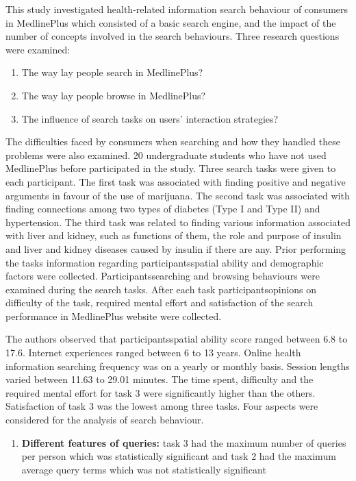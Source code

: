 \documentclass[]{article}
\begin{document}
\begin{enumerate}
This study investigated health-related information search behaviour of consumers in MedlinePlus which consisted of a basic search engine, and the impact of the number of concepts involved in the search behaviours. Three research  questions were examined:

\begin{enumerate}
		\item The way lay people search in MedlinePlus?
		\item The way lay people browse in MedlinePlus?  
		\item The influence of search tasks on users' interaction strategies?
\end{enumerate}

The difficulties faced by consumers when searching and how they handled these problems were also examined. 20 undergraduate students who have not used MedlinePlus before participated in the study. Three search tasks were given to each participant. The first task was associated with finding positive and negative arguments in favour of the use of \textquotesingle marijuana\textquotesingle . The second task was associated with finding connections among two types of diabetes (Type I and Type II) and hypertension. The third task was related to finding various information associated with liver and kidney, such as functions of them, the role and purpose of insulin and liver and kidney diseases caused by insulin if there are any. Prior performing the tasks information regarding participants\textquotesingle spatial ability and demographic factors were collected. Participants\textquotesingle   searching and browsing behaviours were examined during the search tasks. After each task participants\textquotesingle opinions on difficulty of the task, required mental effort and satisfaction of the search performance in MedlinePlus website were collected.                

The authors observed that participants\textquotesingle  spatial ability score ranged between 6.8 to 17.6. Internet experiences ranged between 6 to 13 years. Online health information searching frequency was on a yearly or monthly basis. Session lengths varied between 11.63 to 29.01 minutes. The time spent, difficulty and the required mental effort for task 3 were significantly higher than the others. Satisfaction of task 3 was the lowest among three tasks. Four aspects were considered for the analysis of search behaviour. 

\begin{enumerate}
		\item \textbf{Different features of queries:} task 3 had the maximum number of queries per person which was statistically significant and task 2 had the maximum average query terms which was not statistically significant
		

\end{enumerate}
\end{enumerate}
\end{document}

